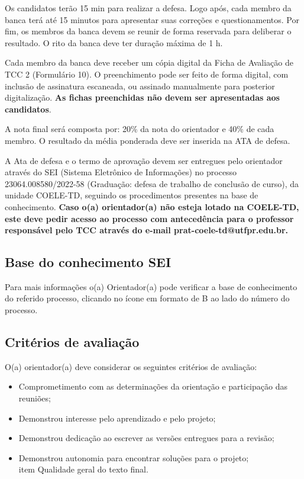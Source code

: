 \documentclass[a4paper, 12pt]{article}
\begin{document}
	Os candidatos terão 15 min para realizar a defesa. Logo após, cada membro da banca terá até 15 minutos para apresentar suas correções e questionamentos. Por fim, os membros da banca devem se reunir de forma reservada para deliberar o resultado. O rito da banca deve ter duração máxima de 1 h.
	
	Cada membro da banca deve receber um cópia digital da Ficha de Avaliação de TCC 2 (Formulário 10). O preenchimento pode ser feito de forma digital, com inclusão de assinatura escaneada, ou assinado manualmente para posterior digitalização. \textbf{As fichas preenchidas não devem ser apresentadas aos candidatos}.
	
	
	A nota final será composta por: 20\% da nota do orientador e 40\% de cada membro. O resultado da média ponderada deve ser inserida na ATA de defesa.
	
	A Ata de defesa e o termo de aprovação devem ser entregues pelo orientador através do SEI (Sistema Eletrônico de Informações) no processo 23064.008580/2022-58 (Graduação: defesa de trabalho de conclusão de curso), da unidade COELE-TD, seguindo os procedimentos presentes na base de conhecimento. \textbf{Caso o(a) orientador(a) não esteja lotado na COELE-TD, este deve pedir acesso ao processo com antecedência para o professor responsável pelo TCC através do e-mail prat-coele-td@utfpr.edu.br.}
	
	\subsection{Base do conhecimento SEI}
	
	Para mais informações o(a) Orientador(a) pode verificar a base de conhecimento do referido processo, clicando no ícone em formato de B ao lado do número do processo.
	
	\subsection{Critérios de avaliação}
	
	O(a) orientador(a) deve considerar os seguintes critérios de avaliação:
	
	\begin{itemize}
		\item Comprometimento com as determinações da orientação e participação das reuniões;
		\item Demonstrou interesse pelo aprendizado e pelo projeto;
		\item Demonstrou dedicação ao escrever as versões entregues para a revisão;
		\item Demonstrou autonomia para encontrar soluções para o projeto;
		\\item Qualidade geral do texto final.
	\end{itemize}
\end{document}
